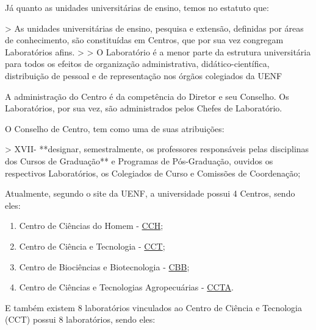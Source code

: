     Já quanto as unidades universitárias de ensino, temos no estatuto que:

    > As unidades universitárias de ensino, pesquisa e extensão, definidas por áreas de conhecimento, são constituídas em Centros, que por sua vez congregam Laboratórios afins.
    >
    > O Laboratório é a menor parte da estrutura universitária para todos os efeitos de organização administrativa, didático-científica, distribuição de pessoal e de representação nos órgãos colegiados da UENF

    A administração do Centro é da competência do Diretor e seu Conselho. Os Laboratórios, por sua vez, são administrados pelos Chefes de Laboratório.

    O Conselho de Centro, tem como uma de suas atribuições:

    > XVII- **designar, semestralmente, os professores responsáveis pelas disciplinas dos Cursos de Graduação** e Programas de Pós-Graduação, ouvidos os respectivos Laboratórios, os Colegiados de Curso e Comissões de Coordenação;

    Atualmente, segundo o site da UENF, a universidade possui 4 Centros, sendo eles:

    \begin{enumerate}
        \item Centro de Ciências do Homem - \href{https://uenf.br/}{CCH};
        \item Centro de Ciência e Tecnologia - \href{https://uenf.br/cct/}{CCT};
        \item Centro de Biociências e Biotecnologia - \href{https://uenf.br/}{CBB};
        \item Centro de Ciências e Tecnologias Agropecuárias - \href{https://uenf.br/}{CCTA}.
    \end{enumerate}

    E também existem 8 laboratórios vinculados ao Centro de Ciência e Tecnologia (CCT) possui 8 laboratórios, sendo eles:

